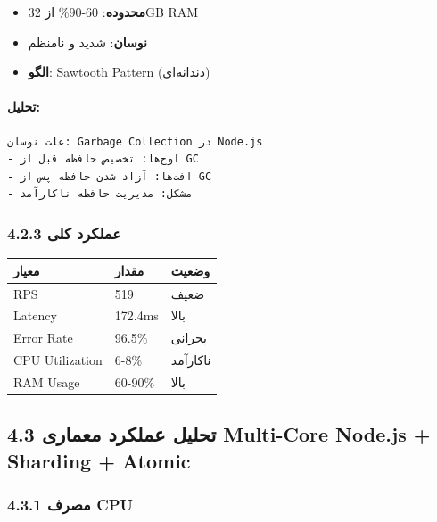 \documentclass[
]{article}
\newcounter{none} %
\providecommand{\tightlist}{%
  \setlength{\itemsep}{0pt}\setlength{\parskip}{0pt}}
\begin{document}
\begin{itemize}
\tightlist
\item
  \textbf{محدوده}: 60-90\% از 32GB RAM
\item
  \textbf{نوسان}: شدید و نامنظم
\item
  \textbf{الگو}: Sawtooth Pattern (دندانه‌ای)
\end{itemize}

\paragraph{تحلیل:}\label{ux62aux62dux644ux6ccux644-1}

\begin{verbatim}
علت نوسان: Garbage Collection در Node.js
- اوج‌ها: تخصیص حافظه قبل از GC
- افت‌ها: آزاد شدن حافظه پس از GC
- مشکل: مدیریت حافظه ناکارآمد
\end{verbatim}

\subsubsection{4.2.3 عملکرد
کلی}\label{ux639ux645ux644ux6a9ux631ux62f-ux6a9ux644ux6cc}

{\def\LTcaptype{none} %
\begin{longtable}[]{@{}lll@{}}
\toprule\noalign{}
معیار & مقدار & وضعیت \\
\midrule\noalign{}
\endhead
\bottomrule\noalign{}
\endlastfoot
RPS & 519 & ضعیف \\
Latency & 172.4ms & بالا \\
Error Rate & 96.5\% & بحرانی \\
CPU Utilization & 6-8\% & ناکارآمد \\
RAM Usage & 60-90\% & بالا \\
\end{longtable}
}

\subsection{4.3 تحلیل عملکرد معماری Multi-Core Node.js + Sharding +
Atomic}\label{ux62aux62dux644ux6ccux644-ux639ux645ux644ux6a9ux631ux62f-ux645ux639ux645ux627ux631ux6cc-multi-core-node.js-sharding-atomic}

\subsubsection{4.3.1 مصرف CPU}\label{ux645ux635ux631ux641-cpu-1}
\end{document}
